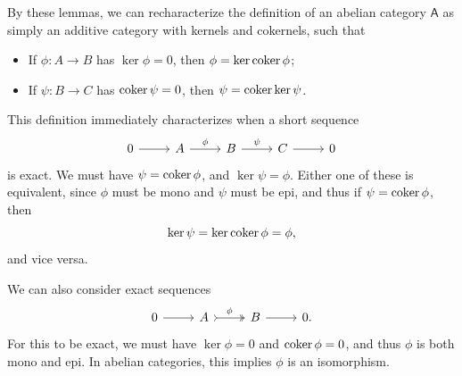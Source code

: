 By these lemmas, we can recharacterize the definition of an abelian category $\mathsf{A} $ as simply an additive category with kernels and cokernels, such that
\begin{itemize}
	\item If $\phi : A \to B$ has $\ker \phi =0$, then $\phi=\ker \operatorname{coker} \phi $;
	\item If $\psi : B \to C$ has $\operatorname{coker} \psi =0$, then $\psi=\operatorname{coker} \ker \psi $.
\end{itemize}
This definition immediately characterizes when a short sequence
\[\begin{tikzcd}[row sep = 2.5em, column sep = 2.5em]
	0\arrow[r]&A\arrow[r, "\phi "]&B\arrow[r, "\psi "]&C\arrow[r]&0
\end{tikzcd}\]
is exact. We must have $\psi =\operatorname{coker} \phi $, and $\ker \psi =\phi $. Either one of these is equivalent, since $\phi $ must be mono and $\psi $ must be epi, and thus if $\psi =\operatorname{coker} \phi $, then
\[
	\ker \psi =\ker \operatorname{coker} \phi =\phi 
,\]
and vice versa.

We can also consider exact sequences
\[\begin{tikzcd}[row sep = 2.5em, column sep = 2.5em]
	0\arrow[r]&A\arrow[r, two heads, tail, "\phi "]&B\arrow[r]&0.
\end{tikzcd}\]
For this to be exact, we must have $\ker \phi =0$ and $\operatorname{coker} \phi =0$, and thus $\phi $ is both mono and epi. In abelian categories, this implies $\phi $ is an isomorphism.

